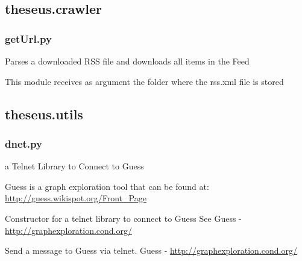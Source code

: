 \documentclass[letterpaper,10pt,english]{sphinxmanual}
\begin{document}
\subsection{theseus.crawler}
\label{theseus:theseus-crawler}\label{theseus:module-theseus.crawler.getUrl}

\subsubsection{getUrl.py}
\label{theseus:geturl-py}
Parses a downloaded RSS file and downloads all items in the Feed

\begin{fulllineitems}
\label{theseus:theseus.crawler.getUrl.main}
This module receives as argument the folder where the rss.xml file is stored

\end{fulllineitems}



\subsection{theseus.utils}
\label{theseus:module-theseus.utils.dnet}\label{theseus:theseus-utils}

\subsubsection{dnet.py}
\label{theseus:dnet-py}
a Telnet Library to Connect to Guess

Guess is a graph exploration tool that can be found at: \href{http://guess.wikispot.org/Front\_Page}{http://guess.wikispot.org/Front\_Page}

\begin{fulllineitems}
\label{theseus:theseus.utils.dnet.Dnet}
Constructor for a telnet library to connect to Guess
See Guess - \href{http://graphexploration.cond.org/}{http://graphexploration.cond.org/}

\begin{fulllineitems}
\label{theseus:theseus.utils.dnet.Dnet.send}
Send a message to Guess via telnet.
Guess - \href{http://graphexploration.cond.org/}{http://graphexploration.cond.org/}

\end{fulllineitems}


\end{fulllineitems}
\end{document}
